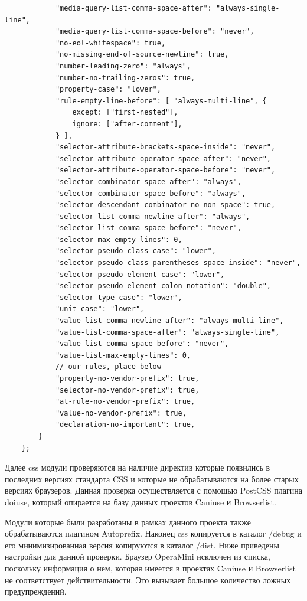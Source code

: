 \begin{small}
\begin{verbatim}
            "media-query-list-comma-space-after": "always-single-line",
            "media-query-list-comma-space-before": "never",
            "no-eol-whitespace": true,
            "no-missing-end-of-source-newline": true,
            "number-leading-zero": "always",
            "number-no-trailing-zeros": true,
            "property-case": "lower",
            "rule-empty-line-before": [ "always-multi-line", {
                except: ["first-nested"],
                ignore: ["after-comment"],
            } ],
            "selector-attribute-brackets-space-inside": "never",
            "selector-attribute-operator-space-after": "never",
            "selector-attribute-operator-space-before": "never",
            "selector-combinator-space-after": "always",
            "selector-combinator-space-before": "always",
            "selector-descendant-combinator-no-non-space": true,
            "selector-list-comma-newline-after": "always",
            "selector-list-comma-space-before": "never",
            "selector-max-empty-lines": 0,
            "selector-pseudo-class-case": "lower",
            "selector-pseudo-class-parentheses-space-inside": "never",
            "selector-pseudo-element-case": "lower",
            "selector-pseudo-element-colon-notation": "double",
            "selector-type-case": "lower",
            "unit-case": "lower",
            "value-list-comma-newline-after": "always-multi-line",
            "value-list-comma-space-after": "always-single-line",
            "value-list-comma-space-before": "never",
            "value-list-max-empty-lines": 0,
            // our rules, place below
            "property-no-vendor-prefix": true,
            "selector-no-vendor-prefix": true,
            "at-rule-no-vendor-prefix": true,
            "value-no-vendor-prefix": true,
            "declaration-no-important": true,
        }
    };
\end{verbatim}
\end{small}

 Далее css модули проверяются на наличие директив которые появились в последних версиях стандарта CSS и которые не обрабатываются на более старых версиях браузеров. Данная проверка осуществляется с помощью PostCSS плагина doiuse, который опирается на базу данных проектов Caniuse и Browserlist. 
 
 
Модули которые были разработаны в рамках данного проекта также обрабатываются плагином Autoprefix. Наконец css копируется в каталог /debug и его минимизированная версия копируются в каталог /dist. Ниже приведены настройки для данной проверки. Браузер OperaMini исключен из списка, поскольку информация о нем, которая имеется в проектах Caniuse и Browserlist не соответствует действительности. Это вызывает большое количество ложных предупреждений.  

